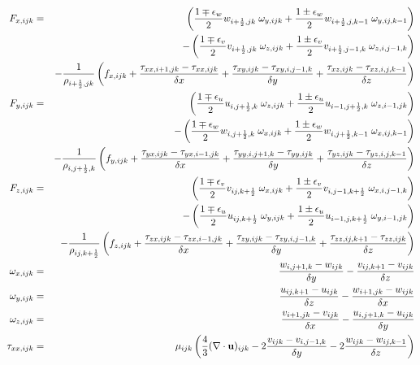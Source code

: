 \documentclass[11pt]{book}
\begin{document}
\begin{eqnarray}
F_{\x,ijk} &=&  \left(
 \frac{1\mp\epsilon_w}{2} w_{i+\ha,jk} \; \om_{y,ijk} +
 \frac{1\pm\epsilon_w}{2} w_{i+\ha,j,k-1} \; \om_{y,ij,k-1} \right) \nonumber \\
          & & - \left(
 \frac{1\mp\epsilon_v}{2} v_{i+\ha,jk} \; \om_{z,ijk} +
 \frac{1\pm\epsilon_v}{2} v_{i+\ha,j-1,k} \; \om_{z,i,j-1,k} \right) \nonumber\\
           & & - \frac{1}{\rho_{i+\ha,jk}} \left( f_{x,ijk}
  + \frac{\tau_{xx,i+1,jk}-\tau_{xx,ijk}}{\dx}
  + \frac{\tau_{xy,ijk}-\tau_{xy,i,j-1,k}}{\dy}
  + \frac{\tau_{xz,ijk}-\tau_{xz,i,j,k-1}}{\dz}  \right)  \\
F_{\y,ijk} &=& \left(
 \frac{1\mp\epsilon_u}{2} u_{i,j+\ha,k} \; \om_{z,ijk} +
 \frac{1\pm\epsilon_u}{2} u_{i-1,j+\ha,k} \; \om_{z,i-1,jk} \right) \nonumber \\
           & & - \left(
 \frac{1\mp\epsilon_w}{2} w_{i,j+\ha,k} \; \om_{x,ijk}+
 \frac{1\pm\epsilon_w}{2} w_{i,j+\ha,k-1} \; \om_{x,ij,k-1} \right) \nonumber \\
           & & - \frac{1}{\rho_{i,j+\ha,k}} \left( f_{y,ijk}
  + \frac{\tau_{yx,ijk}-\tau_{yx,i-1,jk}}{\dx}
  + \frac{\tau_{yy,i,j+1,k}-\tau_{yy,ijk}}{\dy}
  + \frac{\tau_{yz,ijk}-\tau_{yz,i,j,k-1}}{\dz} \right) \\
F_{\z,ijk} &=&  \left(
 \frac{1\mp\epsilon_v}{2} v_{ij,k+\ha} \; \om_{x,ijk} +
 \frac{1\pm\epsilon_v}{2} v_{i,j-1,k+\ha} \; \om_{x,i,j-1,k} \right)\nonumber \\
           & & -\left(
 \frac{1\mp\epsilon_u}{2} u_{ij,k+\ha} \; \om_{y,ijk} +
 \frac{1\pm\epsilon_u}{2} u_{i-1,j,k+\ha} \; \om_{y,i-1,jk} \right) \nonumber \\
           & & - \frac{1}{\rho_{ij,k+\ha}} \left( f_{z,ijk}
  + \frac{\tau_{zx,ijk}-\tau_{zx,i-1,jk}}{\dx}
  + \frac{\tau_{zy,ijk}-\tau_{zy,i,j-1,k}}{\dy}
  + \frac{\tau_{zz,ij,k+1}-\tau_{zz,ijk}}{\dz} \right) \\
\om_{x,ijk} &=& \frac{\hw_{i,j+1,k}-\hw_{ijk}}{\dy} -
             \frac{\hv_{ij,k+1}-\hv_{ijk}}{ \dz}  \\
\om_{y,ijk} &=& \frac{\hu_{ij,k+1}-\hu_{ijk}}{\dz} -
             \frac{\hw_{i+1,jk}-\hw_{ijk}}{\dx}  \\
\om_{z,ijk} &=& \frac{\hv_{i+1,jk}- \hv_{ijk}}{\dx} -
             \frac{\hu_{i,j+1,k}-\hu_{ijk}}{ \dy} \\
\tau_{xx,ijk} &=& \mu_{ijk} \left( \ft (\nabla \cdot \bu)_{ijk} - 2 \frac{v_{ijk}-v_{i,j-1,k}}{\dy} - 2 \frac{w_{ijk}-w_{ij,k-1}}{\dz} \right)  \\

\end{eqnarray}
\end{document}
